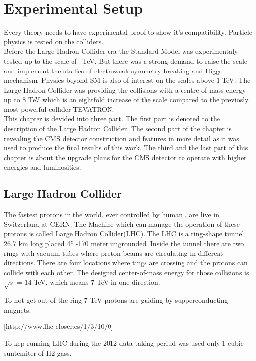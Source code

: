 \chapter{Experimental Setup}
Every theory needs to have experimental proof to show it's compatibility. Particle physics is tested on
the colliders.
\\
Before the Large Hadron Collider era the Standard Model was experimentaly tested up to the scale of ~TeV.
But there was a strong demand to raise the scale and implement the studies of electroweak symmetry breaking
and Higgs mechanism.
Physics beyond SM is also of interest on the scales above 1 TeV.
The Large Hadron Collider\cite{LHCmachine} was providing the collisions with a centre-of-mass energy
up to 8 TeV which is an eightfold increase of the scale compared to the previosly most powerful collider TEVATRON.
\\
This chapter is devided into three part.
The first part is denoted to the description of the Large Hadron Collider. The second part of the 
chapter is revealing the CMS detector construction and features in more detail as it was used to produce the final
results of this work. The third and the last part of this chapter is about the upgrade plans for the
CMS detector to operate with higher energies and luminosities.

\section{Large Hadron Collider}

The fastest protons in the world, ever controlled by human , are live in Switzerland at CERN.
The Machine which can manage the operation of these protons is called Large Hadron Collider(LHC). 
The LHC is a ring-shape tunnel 26.7 km long  placed 45 -170 meter ungrounded. 
Inside the tunnel there are two rings with vacuum tubes where proton beams are circulating in different directions.
There are four locations where tings are crossing and the protons can collide with each other. 
The designed center-of-mass energy for those collisions is $\sqrt{s}$ = 14 TeV, which means 7 TeV in one direction.


To not get out of the ring 7 TeV protons are guiding by supperconducting magnets. 



[http://www.lhc-closer.es/1/3/10/0]

To kep running LHC during the 2012 data taking periud was used only 1 cubic suntemiter of H2 gass.

